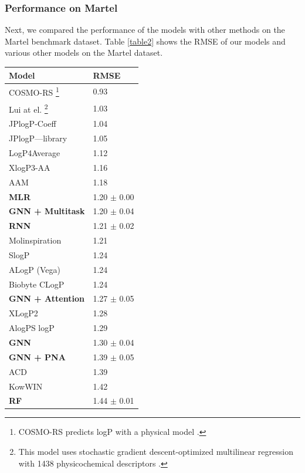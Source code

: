 \documentclass{article}
\begin{document}
\subsubsection{Performance on Martel}

Next, we compared the performance of the models with other methods on the Martel benchmark dataset. Table \ref{table2} shows the RMSE of our models and various other models on the Martel dataset.

\begin{center}
\begin{tabular}{ | m{5cm} | m{2.5cm}| } 
  \hline
  \textbf{Model} & \textbf{RMSE} \\ 
  \hline
  COSMO-RS \footnote{COSMO-RS predicts logP with a physical model \cite{ulrich2021exploring}.} & 0.93 \\
  \hline
  Lui at el. \footnote{This model uses stochastic gradient descent-optimized multilinear regression with 1438 physicochemical descriptors \cite{lui2020comparison}.} & 1.03 \\
  \hline
  JPlogP-Coeff & 1.04 \\ 
  \hline
  JPlogP—library & 	1.05 \\
  \hline
  LogP4Average & 1.12 \\ 
  \hline
  XlogP3-AA & 1.16 \\
  \hline
  AAM & 1.18 \\ 
  \hline
  \textbf{MLR} & 1.20 $\pm$ 0.00 \\ 
  \hline
  \textbf{GNN + Multitask} & 1.20 $\pm$ 0.04 \\ 
  \hline
  \textbf{RNN} & 1.21 $\pm$ 0.02 \\
  \hline
  Molinspiration & 	1.21 \\ 
  \hline
  SlogP & 1.24 \\ 
  \hline
  ALogP (Vega) & 1.24 \\
  \hline
  Biobyte CLogP & 	1.24 \\ 
  \hline
  \textbf{GNN + Attention} & 1.27 $\pm$ 0.05 \\
  \hline
  XLogP2 & 	1.28 \\ 
  \hline
  AlogPS logP & 1.29 \\ 
  \hline
  \textbf{GNN} & 1.30 $\pm$ 0.04 \\
  \hline
  \textbf{GNN + PNA} & 1.39 $\pm$ 0.05 \\
  \hline
  ACD & 1.39 \\
  \hline
  KowWIN & 1.42 \\
  \hline
  \textbf{RF} & 1.44 $\pm$ 0.01 \\

\end{tabular}
\end{center}
\end{document}
